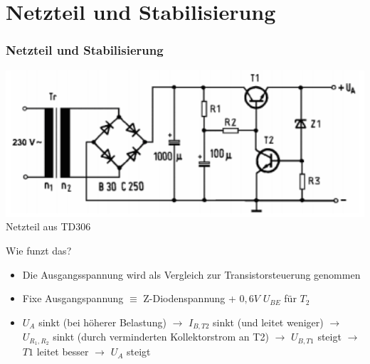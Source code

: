 \section*{Netzteil und Stabilisierung}
\begin{frame}
  \frametitle{Netzteil und Stabilisierung}
    \begin{center}
        \includegraphics[width=1\textwidth,height=.43\textheight,keepaspectratio]{a17/TD306.png}
        {\tiny Netzteil aus TD306 \hyperlink{refs}{\cite{bna}}}
    \end{center}
    Wie funzt das?
\begin{itemize}
  \item Die Ausgangsspannung wird als Vergleich zur Transistorsteuerung genommen
  \item Fixe Ausgangspannung $\equiv$ Z-Diodenspannung + $0,6V$ $U_{BE}$ für $T_2$
  \item $U_A$ sinkt (bei höherer Belastung) $\rightarrow$ $I_{B,T2}$ sinkt (und leitet weniger) $\rightarrow$ $U_{R_1,R_2}$ sinkt (durch verminderten Kollektorstrom an T2) $\rightarrow$ $U_{B,T1}$ steigt $\rightarrow$ $T1$ leitet besser $\rightarrow$ $U_A$ steigt
\end{itemize}
\end{frame}

